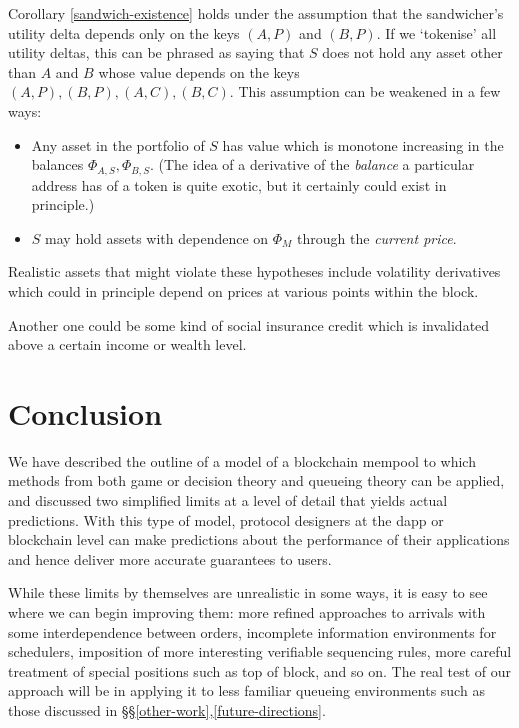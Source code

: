 \documentclass[a4paper,11pt]{article}
\begin{document}
\begin{remark} \label{exotic-derivative}

  Corollary \ref{sandwich-existence} holds under the assumption that the sandwicher's utility delta depends only on the keys $(A,P)$ and $(B,P)$.
  If we `tokenise' all utility deltas, this can be phrased as saying that $S$ does not hold any asset other than $A$ and $B$ whose value depends on the keys $(A,P),(B,P),(A,C),(B,C)$.
  This assumption can be weakened in a few ways:
  \begin{itemize}
    \item 
      Any asset in the portfolio of $S$ has value which is monotone increasing in the balances $\Phi_{A,S},\Phi_{B,S}$.
      (The idea of a derivative of the \emph{balance} a particular address has of a token is quite exotic, but it certainly could exist in principle.)
    \item 
      $S$ may hold assets with dependence on $\Phi_M$ through the \emph{current price}.
  \end{itemize}
  Realistic assets that might violate these hypotheses include volatility derivatives which could in principle depend on prices at various points within the block.
  
  Another one could be some kind of social insurance credit which is invalidated above a certain income or wealth level.
  
\end{remark}

\section{Conclusion}

We have described the outline of a model of a blockchain mempool to which methods from both game or decision theory and queueing theory can be applied, and discussed two simplified limits at a level of detail that yields actual predictions.
%
With this type of model, protocol designers at the dapp or blockchain level can make predictions about the performance of their applications and hence deliver more accurate guarantees to users.

While these limits by themselves are unrealistic in some ways, it is easy to see where we can begin improving them: more refined approaches to arrivals with some interdependence between orders, incomplete information environments for schedulers, imposition of more interesting verifiable sequencing rules, more careful treatment of special positions such as top of block, and so on.
%
The real test of our approach will be in applying it to less familiar queueing environments such as those discussed in \S\S\ref{other-work},\ref{future-directions}.


\nocite{angeris2019analysis}
\nocite{angeris2020improved}

\printbibliography
\end{document}
